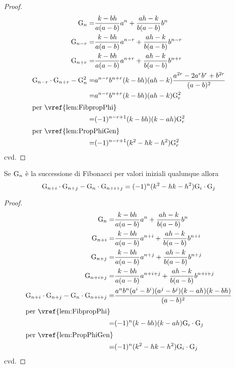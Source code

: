 \begin{proof}
	\begin{align*}
		\Gib{n}=&{}\dfrac{k-bh}{a(a-b)}a^n+\dfrac{ah-k}{b(a-b)}b^n\\
		\Gib{n-r}=&{}\dfrac{k-bh}{a(a-b)}a^{n-r}+\dfrac{ah-k}{b(a-b)}b^{n-r}\\
		\Gib{n+r}=&{}\dfrac{k-bh}{a(a-b)}a^{n+r}+\dfrac{ah-k}{b(a-b)}b^{n+r}\\
		\Gib{n-r}\cdot\Gib{n+r}-\Gib{n}^2=&a^{n-r}b^{n+r}(k-bh)(ah-k)\dfrac{a^{2r}-2a^rb^r+b^{2r}}{(a-b)^2}\\
	=&{}a^{n-r}b^{n+r}(k-bh)(ah-k)\Gib{r}^2\\
		\intertext{per~\vref{lem:FibpropPhi}}
	=&{}(-1)^{n-r+1}(k-bh)(k-ah)\Gib{r}^2\\
		\intertext{per~\vref{lem:PropPhiGen}}
	=&{}(-1)^{n-r+1}(k^2-hk-h^2)\Gib{r}^2
	\end{align*}
	cvd.
\end{proof}
\begin{thm}\label{thm:fibVajdaGen}
	Se $\mathrm{G}_{n}$ è la successione di Fibonacci per valori iniziali qualunque 
	allora 
	\begin{equation}
		\mathrm{G}_{n+i}\cdot\mathrm{G}_{n+j}-\mathrm{G}_{n}\cdot\mathrm{G}_{n+i+j}=(-1)^{n}(k^2-hk-h^2)\mathrm{G}_{i}\cdot\mathrm{G}_{j}
	\end{equation}\label{eqn:fibVajdaGen}
\end{thm}
\begin{proof}
	\begin{align*}
		\Gib{n}=&{}\dfrac{k-bh}{a(a-b)}a^n+\dfrac{ah-k}{b(a-b)}b^n\\
		\Gib{n+i}=&{}\dfrac{k-bh}{a(a-b)}a^{n+i}+\dfrac{ah-k}{b(a-b)}b^{n+i}\\
		\Gib{n+j}=&{}\dfrac{k-bh}{a(a-b)}a^{n+j}+\dfrac{ah-k}{b(a-b)}b^{n+j}\\
		\Gib{n+i+j}=&{}\dfrac{k-bh}{a(a-b)}a^{n+i+j}+\dfrac{ah-k}{b(a-b)}b^{n+i+j}\\
		\Gib{n+i}\cdot\Gib{n+j}-\Gib{n}\cdot\Gib{n+i+j}=&\dfrac{a^nb^n(a^i-b^i)(a^j-b^j)(k-ah)(k-bh)}{(a-b)^2}\\
		\intertext{per~\vref{lem:FibpropPhi}}
	=&{}(-1)^{n}(k-bh)(k-ah)\Gib{i}\cdot\Gib{j}\\
		\intertext{per~\vref{lem:PropPhiGen}}
	=&{}(-1)^{n}(k^2-hk-h^2)\Gib{i}\cdot\Gib{j}\\
	\end{align*}
	cvd.
\end{proof}
